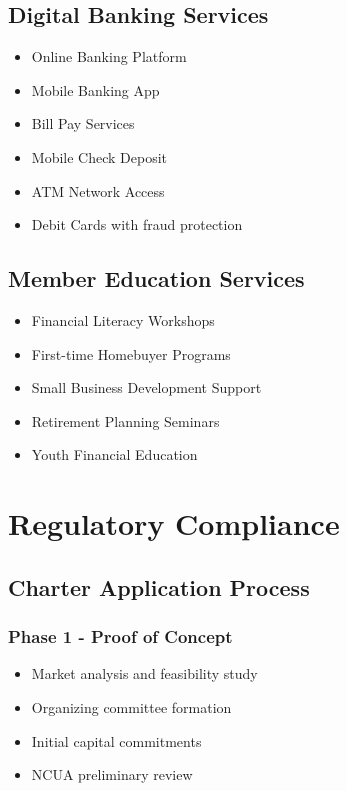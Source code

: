 \documentclass[11pt,letterpaper]{article}
\begin{document}
\subsection{Digital Banking Services}
\begin{itemize}[leftmargin=*]
    \item Online Banking Platform
    \item Mobile Banking App
    \item Bill Pay Services
    \item Mobile Check Deposit
    \item ATM Network Access
    \item Debit Cards with fraud protection
\end{itemize}

\subsection{Member Education Services}
\begin{itemize}[leftmargin=*]
    \item Financial Literacy Workshops
    \item First-time Homebuyer Programs
    \item Small Business Development Support
    \item Retirement Planning Seminars
    \item Youth Financial Education
\end{itemize}

\section{Regulatory Compliance}

\subsection{Charter Application Process}

\subsubsection{Phase 1 - Proof of Concept}
\begin{itemize}[leftmargin=*]
    \item Market analysis and feasibility study
    \item Organizing committee formation
    \item Initial capital commitments
    \item NCUA preliminary review
\end{itemize}
\end{document}
